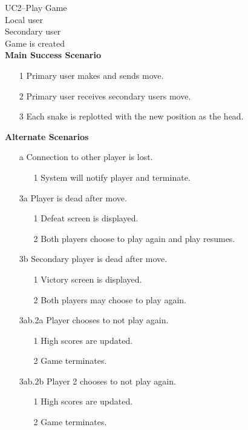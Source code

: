 \documentclass[titlepage]{article}
\begin{document}
	\textbf{} UC2--Play Game\\
	\textbf{} Local user\\
	\textbf{} Secondary user\\
	\textbf{} Game is created\\
	\textbf{Main Success Scenario}
	\begin{enumerate}
		\itemsep0em 
		\item[1] Primary user makes and sends move.
		\item[2] Primary user receives secondary users move.
		\item[3] Each snake is replotted with the new position as the head.
	\end{enumerate}
	\textbf{Alternate Scenarios}
	\begin{enumerate}
		\itemsep0em 
		\item[a]Connection to other player is lost.
		\begin{enumerate}
			\itemsep0em 
			\item[1]System will notify player and terminate.
		\end{enumerate}
		\item[3a]Player is dead after move.
		\begin{enumerate}
			\itemsep0em 
			\item[1]Defeat screen is displayed.
			\item[2]Both players choose to play again and play resumes.
		\end{enumerate}
		\item[3b]Secondary player is dead after move.
		\begin{enumerate}
			\itemsep0em 
			\item[1]Victory screen is displayed.
			\item[2]Both players may choose to play again.
		\end{enumerate}
				\item[3ab.2a]Player chooses to not play again.
				\begin{enumerate}
					\itemsep0em 
					\item[1]High scores are updated.
					\item[2]Game terminates.
				\end{enumerate}
				\item[3ab.2b]Player 2 chooses to not play again.
				\begin{enumerate}
					\itemsep0em 
					\item[1]High scores are updated.
					\item[2]Game terminates.
				\end{enumerate}
	\end{enumerate}
		
\end{document}
